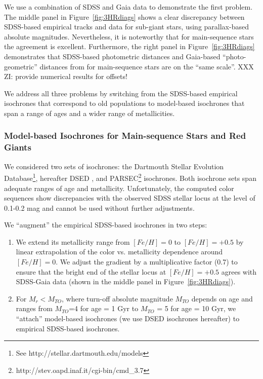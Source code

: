 We use a combination of SDSS and Gaia data to demonstrate the first problem. The middle panel in Figure~\ref{fig:3HRdiags} 
shows a clear discrepancy between SDSS-based empirical tracks and data for sub-giant stars, using parallax-based absolute
magnitudes. Nevertheless, it is noteworthy that
for main-sequence stars the agreement is excellent. Furthermore, the right panel in Figure~\ref{fig:3HRdiags} demonstrates
that SDSS-based photometric distances and Gaia-based ``photo-geometric'' distances from \cite{bailer-jones_estimating_2021}
for main-sequence stars are on the ``same scale''.  XXX ZI: provide numerical results for offsets! 
 
We address all three problems by switching from the SDSS-based empirical isochrones that correspond to old
populations to model-based isochrones that span a range of ages and a wider range of metallicities. 
 

\subsubsection{Model-based Isochrones for Main-sequence Stars and Red Giants}
 

We considered two sets of isochrones: the Dartmouth Stellar Evolution Database\footnote{See http://stellar.dartmouth.edu/models},
hereafter DSED \citep{2008ApJS..178...89D}, and PARSEC\footnote{http://stev.oapd.inaf.it/cgi-bin/cmd\_3.7} \citep{2012MNRAS.427..127B} isochrones. 
Both isochrone sets span adequate ranges of age and metallicity. Unfortunately, the computed color sequences show discrepancies
with the observed SDSS stellar locus at the level of 0.1-0.2 mag and cannot be used without further adjustments.

We ``augment'' the empirical SDSS-based isochrones in two steps:
\begin{enumerate}
\item We extend its metallicity range from $[Fe/H]=0$ to $[Fe/H]=+0.5$ by linear extrapolation of the color vs. metallicity
  dependence around $[Fe/H]=0$. We adjust the gradient by a multiplicative factor (0.7) to ensure that the bright end of the
  stellar locus at $[Fe/H]=+0.5$ agrees with SDSS-Gaia data (shown in the middle panel in Figure~\ref{fig:3HRdiags}).
\item 
  For $M_r < M_{TO}$, where turn-off absolute magnitude $M_{TO}$ depends on age and ranges from $M_{TO}$=4 for age = 1 Gyr
  to $M_{TO}$ = 5 for age = 10 Gyr, we ``attach'' model-based isochrones (we use DSED isochrones hereafter) to empirical
  SDSS-based isochrones.
\end{enumerate}

